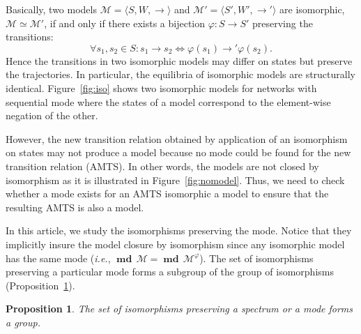 \documentclass[12pt]{elsarticle}
\newtheorem{proposition}{Proposition}
\newcommand{\tuple}[1]{\langle #1 \rangle}
\newcommand{\abbrev}[1]{#1, \relax}
\newcommand{\ie}[0]{\abbrev{\textit{i.e.}}}
\newcommand{\evo}[0]{\longrightarrow}
\newcommand{\mode}[0]{\operatorname{\textbf{md}} \,}
\begin{document}
Basically, two models $\mathcal M= \tuple{S,W,\evo}$ and $\mathcal M'= \tuple{S',W',\evo'}$ are isomorphic, $\mathcal M \simeq \mathcal M'$, if and only if there exists a bijection $\varphi:S \to S'$ preserving the transitions:
$$ \forall s_1,s_2 \in S: s_1 \evo s_2 \iff \varphi(s_1) \evo' \varphi(s_2).$$
 Hence the transitions in two isomorphic models may differ on states but preserve the trajectories. In particular, the equilibria of isomorphic models are structurally identical. 
Figure~\ref{fig:iso} shows two isomorphic models for networks with sequential mode where the states of a model correspond to the element-wise negation of the other. 

 However, the new transition relation obtained by application of an isomorphism on states may not produce a model because no mode could be found for the new transition relation (AMTS). In other words, the models are not closed by isomorphism as it is illustrated in Figure~\ref{fig:nomodel}. Thus, we need to check whether a mode exists for an AMTS isomorphic a model to ensure that the resulting AMTS is also a model. 

In this article, we study the isomorphisms preserving the mode. Notice that they implicitly insure the model closure by isomorphism since any isomorphic model has the same mode (\ie $\mode \mathcal M = \mode \mathcal M^\varphi$). 
The set of isomorphisms preserving a particular mode forms a subgroup of the group of isomorphisms (Proposition~\ref{prop:subgroup}).

\begin{proposition} 
\label{prop:subgroup}
The set of isomorphisms preserving a spectrum or a mode forms a group.
\end{proposition}
\end{document}
